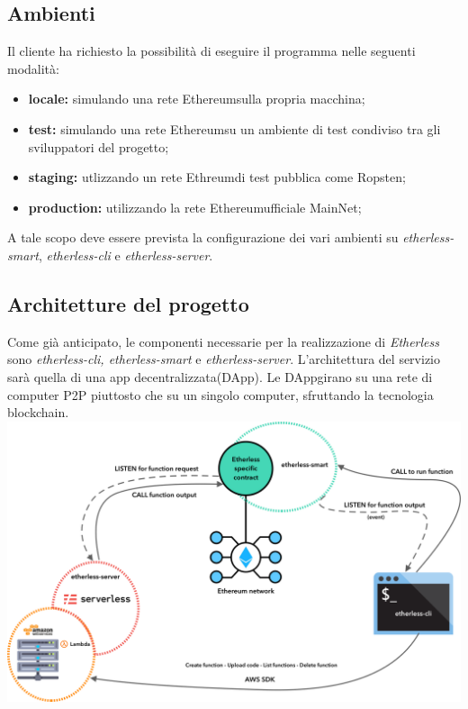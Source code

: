 \subsection{Ambienti}
Il cliente ha richiesto la possibilità di eseguire il programma nelle seguenti modalità:
\begin{itemize}
	\item \textbf{locale:} simulando una rete Ethereum\glo sulla propria macchina;
	\item \textbf{test:} simulando una rete Ethereum\glo su un ambiente di test condiviso tra gli sviluppatori del progetto;
	\item \textbf{staging:} utlizzando un rete Ethreum\glo di test pubblica come Ropsten\glo;
	\item \textbf{production:} utilizzando la rete Ethereum\glo ufficiale MainNet\glo;
\end{itemize}
A tale scopo deve essere prevista la configurazione dei vari ambienti su \textit{etherless-smart}, \textit{etherless-cli} e \textit{etherless-server}.
\subsection{Architetture del progetto}
Come già anticipato, le componenti necessarie per la realizzazione di \textit{Etherless} sono \textit{etherless-cli, etherless-smart} e \textit{etherless-server}. L'architettura del servizio sarà quella di una app decentralizzata\glo (DApp\glo). Le DApp\glo girano su una rete di computer P2P piuttosto che su un singolo computer, sfruttando la tecnologia blockchain\glo.\\
\includegraphics[width=\textwidth]{res/img/archi}
